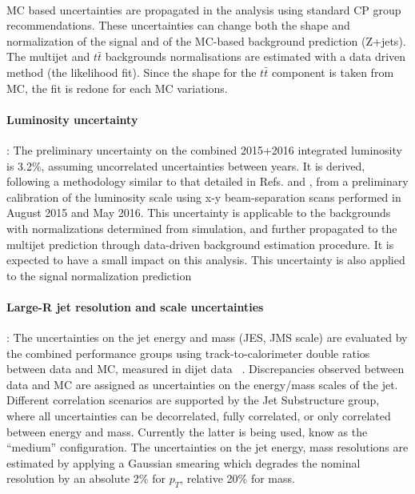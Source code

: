 \paragraph{}
MC based uncertainties are propagated in the analysis using standard CP group recommendations. These uncertainties can change both the shape and normalization of the signal and of the MC-based background prediction (Z+jets). The multijet and $t\bar{t}$ backgrounds normalisations are estimated with a data driven method (the likelihood fit). Since the shape for the $t\bar{t}$ component is taken from MC, the fit is redone for each MC variations.

\paragraph{Luminosity uncertainty}: The preliminary uncertainty on the combined 2015+2016 integrated luminosity is 3.2\%, assuming uncorrelated uncertainties between years. It is derived, following a methodology similar to that detailed in Refs. \cite{Aad:2013ucp} and \cite{ATLASlumi8TeV}, from a preliminary calibration of the luminosity scale using x-y beam-separation scans performed in August 2015 and May 2016. This uncertainty is applicable to the backgrounds with normalizations determined from simulation, and further propagated to the multijet prediction through data-driven background estimation procedure. It is expected to have a small impact on this analysis. This uncertainty is also applied to the signal normalization prediction

\paragraph{Large-R jet resolution and scale uncertainties}:
 The uncertainties on the jet energy and mass  (JES, JMS scale) are evaluated by the combined performance groups using track-to-calorimeter double ratios between data and MC, measured in dijet data~\cite{Aad:2013gja,BosonTagPreRec} . Discrepancies observed between data and MC are assigned as uncertainties on the energy/mass scales of the jet. Different correlation scenarios are supported by the Jet Substructure group, where all uncertainties can be decorrelated, fully correlated, or only correlated between energy and mass. Currently the latter is being used, know as the ``medium'' configuration.
The uncertainties on the jet energy, mass resolutions are estimated by applying a Gaussian smearing which degrades the nominal resolution by an absolute 2\% for $p_{T}$, relative 20\% for mass.

